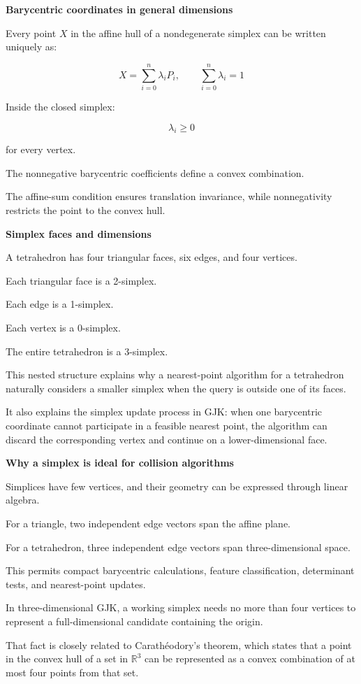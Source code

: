\textbf{Barycentric coordinates in general dimensions}

Every point \(X\) in the affine hull of a nondegenerate simplex can be written uniquely as:

\[
\boxed{ X=\sum_{i=0}^{n}\lambda_iP_i,\qquad \sum_{i=0}^{n}\lambda_i=1 }
\]

Inside the closed simplex:

\[
\lambda_i\ge0
\]

for every vertex.

The nonnegative barycentric coefficients define a convex combination.

The affine-sum condition ensures translation invariance, while nonnegativity restricts the point to the convex hull.

\textbf{Simplex faces and dimensions}

A tetrahedron has four triangular faces, six edges, and four vertices.

Each triangular face is a 2-simplex.

Each edge is a 1-simplex.

Each vertex is a 0-simplex.

The entire tetrahedron is a 3-simplex.

This nested structure explains why a nearest-point algorithm for a tetrahedron naturally considers a smaller simplex when the query is outside one of its faces.

It also explains the simplex update process in GJK: when one barycentric coordinate cannot participate in a feasible nearest point, the algorithm can discard the corresponding vertex and continue on a lower-dimensional face.

\textbf{Why a simplex is ideal for collision algorithms}

Simplices have few vertices, and their geometry can be expressed through linear algebra.

For a triangle, two independent edge vectors span the affine plane.

For a tetrahedron, three independent edge vectors span three-dimensional space.

This permits compact barycentric calculations, feature classification, determinant tests, and nearest-point updates.

In three-dimensional GJK, a working simplex needs no more than four vertices to represent a full-dimensional candidate containing the origin.

That fact is closely related to Carathéodory's theorem, which states that a point in the convex hull of a set in \(\mathbb R^3\) can be represented as a convex combination of at most four points from that set.


